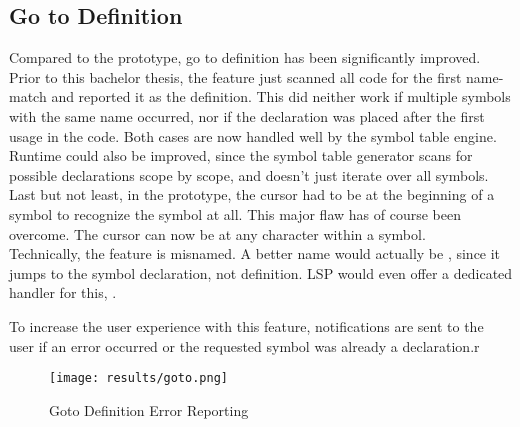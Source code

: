 \subsection{Go to Definition}
Compared to the prototype, go to definition has been significantly improved.
Prior to this bachelor thesis, the feature just scanned all code for the first name-match and reported it as the definition.
This did neither work if multiple symbols with the same name occurred, nor if the declaration was placed after the first usage in the code.
Both cases are now handled well by the symbol table engine.\\

Runtime could also be improved, since the symbol table generator scans for possible declarations scope by scope, and doesn't just iterate over all symbols.
Last but not least, in the prototype, the cursor had to be at the beginning of a symbol to recognize the symbol at all.
This major flaw has of course been overcome.
The cursor can now be at any character within a symbol.\\

Technically, the feature is misnamed.
A better name would actually be , since it jumps to the symbol declaration, not definition.
LSP would even offer a dedicated handler for this,  \cite{lspspec}.

To increase the user experience with this feature, notifications are sent to the user if an error occurred or the requested symbol was already a declaration.r
\begin{figure}[h]
    \centering
    \texttt{[image: results/goto.png]}
    \caption{Goto Definition Error Reporting}
    \label{fig:goto}
\end{figure}


